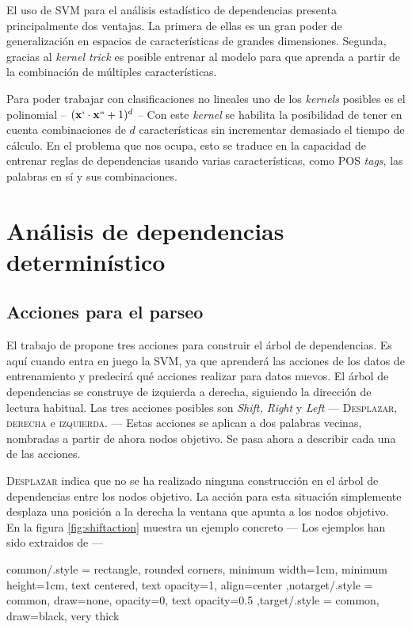 El uso de \ac{SVM} para el análisis estadístico de dependencias presenta
principalmente dos ventajas. La primera de ellas es un gran poder de
generalización en espacios de características de grandes dimensiones. Segunda,
gracias al \emph{kernel trick} es posible entrenar al modelo para que aprenda a
partir de la combinación de múltiples características.

Para poder trabajar con clasificaciones no lineales uno de los \emph{kernels}
posibles es el polinomial -- $(\mathbf{x}` \cdot \mathbf{x}`` + 1)^d$ -- Con
este \emph{kernel} se habilita la posibilidad de tener en cuenta combinaciones
de $d$ características sin incrementar demasiado el tiempo de cálculo. En el
problema que nos ocupa, esto se traduce en la capacidad de entrenar reglas de
dependencias usando varias características, como \ac{POS} \emph{tags}, las
palabras en sí y sus combinaciones.

\section{Análisis de dependencias determinístico}
\label{sec:depanalysis}

\subsection{Acciones para el parseo}
\label{subsec:parseractions}

El trabajo de \citeauthor{yamada2003} propone tres acciones para construir el
árbol de dependencias. Es aquí cuando entra en juego la \ac{SVM}, ya que
aprenderá las acciones de los datos de entrenamiento y predecirá qué acciones
realizar para datos nuevos. El árbol de dependencias se construye de izquierda a
derecha, siguiendo la dirección de lectura habitual. Las tres acciones
posibles son \emph{Shift, Right} y \emph{Left} --- \textsc{Desplazar, derecha} e
\textsc{izquierda}. --- Estas acciones se aplican a dos palabras vecinas, nombradas a
partir de ahora nodos objetivo. Se pasa ahora a describir cada una de las
acciones.

\textsc{Desplazar} indica que no se ha realizado ninguna construcción en el
árbol de dependencias entre los nodos objetivo. La acción para esta situación
simplemente desplaza una posición a la derecha la ventana que apunta a los nodos
objetivo. En la figura \autoref{fig:shiftaction} muestra un ejemplo concreto ---
Los ejemplos han sido extraidos de \citet{yamada2003} ---

\tikzset
  {common/.style =
    {rectangle, rounded corners, minimum width=1cm, minimum height=1cm,
     text centered, text opacity=1, align=center
    }
  ,notarget/.style = {common, draw=none, opacity=0, text opacity=0.5}
  ,target/.style   = {common, draw=black, very thick}
  }

